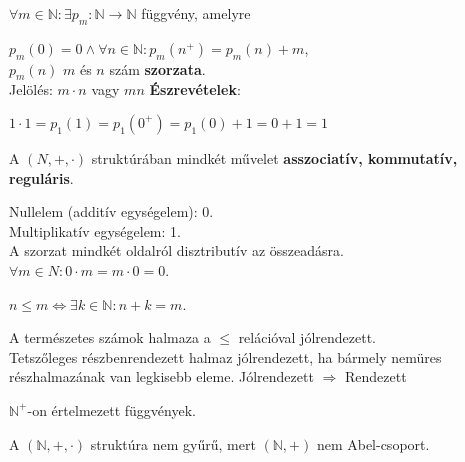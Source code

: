 \begin{frame}
  \begin{tcolorbox}[title={Def.: Szorzás}]
    ${\forall}m \in \mathbb{N} : {\exists} p_m : \mathbb{N} \rightarrow \mathbb{N}$ függvény, amelyre\\
    \mmedskip

    $p_m(0) = 0 \land {\forall}n\in \mathbb{N} : p_m(n^+) = p_m(n) + m$,\\
    $p_m(n)$ $m$ és $n$ szám \textbf{szorzata}.\\
    Jelölés: $m \cdot n$ vagy $mn$
  \tcblower
    \textbf{Észrevételek}:\\
    \mmedskip
    
    $1 \cdot 1 = p_1(1) = p_1(0^+) = p_1(0) + 1 = 0 + 1 = 1$
  \end{tcolorbox}
\end{frame}

\begin{frame}
  \begin{tcolorbox}[title={Tétel: Természetes számok}]
    A $(N, +, {\cdot})$ struktúrában mindkét művelet \textbf{asszociatív, kommutatív, reguláris}.\\
    \msmallskip
    
    Nullelem (additív egységelem): 0.\\
    Multiplikatív egységelem: 1.\\
    A szorzat mindkét oldalról disztributív az összeadásra.\\
    ${\forall}m \in N : 0 \cdot m = m \cdot 0 = 0$.
  \end{tcolorbox}
\end{frame}

\begin{frame}
\begin{tcolorbox}[title={Def.: $\mathbb{N}$ rendezése}]
  $n \leq m \iff {\exists}k \in \mathbb{N}: n + k = m$.
\end{tcolorbox}

\begin{tcolorbox}[title={Tétel: N rendezése}]
A természetes számok halmaza a $\leq$ relációval jólrendezett.\\
{\footnotesize Tetszőleges részbenrendezett halmaz jólrendezett, ha bármely nemüres részhalmazának van legkisebb eleme. Jólrendezett $\Rightarrow$ Rendezett}
\end{tcolorbox}

\begin{tcolorbox}[title={Def.: Végtelen sorozatok}]
  $\mathbb{N}^+$-on értelmezett függvények.
\end{tcolorbox}


\begin{tcolorbox}[title={Ész}]
  A $(\mathbb{N}, +, {\cdot})$ struktúra nem gyűrű, mert $(\mathbb{N}, +)$ nem Abel-csoport.
\end{tcolorbox}
\end{frame}

